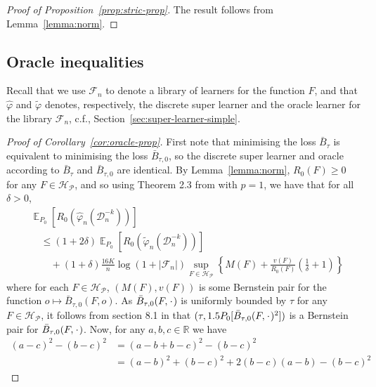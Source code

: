 \documentclass[a4paper,danish]{article}
\theoremstyle{plain} %
\numberwithin{theorem}{section}
\theoremstyle{definition} %
\theoremstyle{remark}
\DeclareMathOperator{\E}{\mathbb{E}} %
\newcommand{\R}{\mathbb{R}}
\newcommand{\blank}{\makebox[1ex]{\textbf{$\cdot$}}}
\renewcommand{\phi}{\varphi}
\newcommand{\1}{\mathds{1}}
\newcommand{\data}{\ensuremath{\mathcal{D}}}
\begin{document}
\begin{proof}[Proof of Proposition~\ref{prop:stric-prop}]
  The result follows from Lemma~\ref{lemma:norm}.
\end{proof}

\subsection{Oracle inequalities}
\label{sec:oracle-inequalities}

Recall that we use \( \mathcal{F}_n \) to denote a library of learners for the
function \( F \), and that \( \hat{\phi} \) and \( \tilde{\phi} \) denotes,
respectively, the discrete super learner and the oracle learner for the library
\( \mathcal{F}_n \), c.f., Section~\ref{sec:super-learner-simple}.

\begin{proof}[Proof of Corollary~\ref{cor:oracle-prop}]
  First note that minimising the loss \( \bar{B}_{\tau} \) is equivalent to
  minimising the loss \( \bar{B}_{\tau,0} \), so the discrete super learner and
  oracle according to \( \bar{B}_{\tau} \) and \( \bar{B}_{\tau,0} \) are
  identical. By Lemma~\ref{lemma:norm}, \( R_0(F) \geq 0 \) for any
  \( F \in \mathcal{H}_{\mathcal{P}} \), and so using Theorem 2.3 from
  \citep{vaart2006oracle} with \( p=1 \), we have that for all \( \delta >0 \),
\begin{align*}
  & \E_{P_0}{\left[ R_0(\hat{\phi}_n(\data_n^{-k})) \right]}
  \\
  &  \quad \leq
    (1+2\delta)\E_{P_0}{\left[ R_0(\tilde{\phi}_n(\data_n^{-k})) \right]}
  \\
  & \qquad + (1+\delta) \frac{16 K}{n}
    \log(1 + |\mathcal{F}_n|)\sup_{F \in \mathcal{H}_{\mathcal{P}}}
    \left\{
    M(F) + \frac{v(F)}{R_0(F)}
    \left(
    \frac{1}{\delta} + 1
    \right)
    \right\}
\end{align*}
where for each \( F \in \mathcal{H}_{\mathcal{P}} \), \( (M(F), v(F)) \) is some Bernstein pair for
the function \(o \mapsto \bar{B}_{\tau,0}(F, o) \). As
\( \bar{B}_{\tau,0}(F, \blank) \) is uniformly bounded by \( \tau \) for any
\( F \in \mathcal{H}_{\mathcal{P}} \), it follows from section 8.1 in \citep{vaart2006oracle} that
\( (\tau, 1.5 P_0{[\bar{B}_{\tau,0}(F, \blank)^2]}) \) is a Bernstein pair for
\( \bar{B}_{\tau,0}(F, \blank) \). Now, for any \( a,b,c \in \R \) we have
\begin{align*}
  (a-c)^2 - (b-c)^2
  & = (a-b+b-c)^2 - (b-c)^2
  \\
  & = (a-b)^2 + (b-c)^2 +2(b-c)(a-b) - (b-c)^2

\end{align*}
\end{proof}
\end{document}
